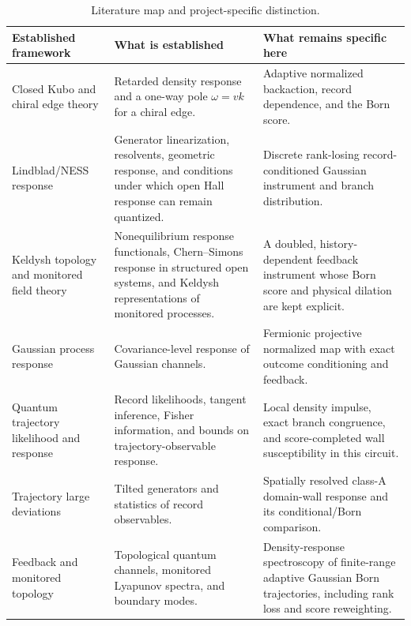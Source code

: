 \documentclass[aps,prb,onecolumn,nofootinbib,superscriptaddress]{revtex4-2}
\begin{document}
\begin{table}[t]
\caption{Literature map and project-specific distinction.}
\label{tab:literature}
\small
\begin{tabularx}{\textwidth}{@{}L{0.21\textwidth}L{0.32\textwidth}Y@{}}
\toprule
Established framework & What is established & What remains specific here \\
\midrule
Closed Kubo and chiral edge theory
\cite{Kubo1957,Wen1990} & Retarded density response and a one-way pole
$\omega=vk$ for a chiral edge. & Adaptive normalized backaction, record
dependence, and the Born score. \\
Lindblad/NESS response
\cite{AvronFraasGraf2012,VenutiZanardi2016,AlbertBradlynFraasJiang2016,KonopikLutz2019,LevyRabaniLimmer2021}
& Generator linearization, resolvents, geometric response, and conditions under
which open Hall response can remain quantized. & Discrete rank-losing
record-conditioned Gaussian instrument and branch distribution. \\
Keldysh topology and monitored field theory
\cite{TonielliBudichAltlandDiehl2020,TalkingtonClaassen2024,KloiberTollingerSieberer2026}
& Nonequilibrium response functionals, Chern--Simons response in structured
open systems, and Keldysh representations of monitored processes. & A doubled,
history-dependent feedback instrument whose Born score and physical dilation
are kept explicit. \\
Gaussian process response \cite{MehboudiParrondoAcin2019} & Covariance-level
response of Gaussian channels. & Fermionic projective normalized map with
exact outcome conditioning and feedback. \\
Quantum trajectory likelihood and response
\cite{GammelmarkMolmer2013,Vu2025} & Record likelihoods, tangent inference,
Fisher information, and bounds on trajectory-observable response. & Local
density impulse, exact branch congruence, and score-completed wall
susceptibility in this circuit. \\
Trajectory large deviations
\cite{GarrahanLesanovsky2010} & Tilted generators and statistics of record
observables. & Spatially resolved class-A domain-wall response and its
conditional/Born comparison. \\
Feedback and monitored topology
\cite{NakagawaUeda2025,OshimaMochizukiHamazakiFuji2025,XiaoKawabata2026} &
Topological quantum channels, monitored Lyapunov spectra, and boundary modes. &
Density-response spectroscopy of finite-range adaptive Gaussian Born
trajectories, including rank loss and score reweighting. \\

\end{tabularx}
\end{table}
\end{document}

